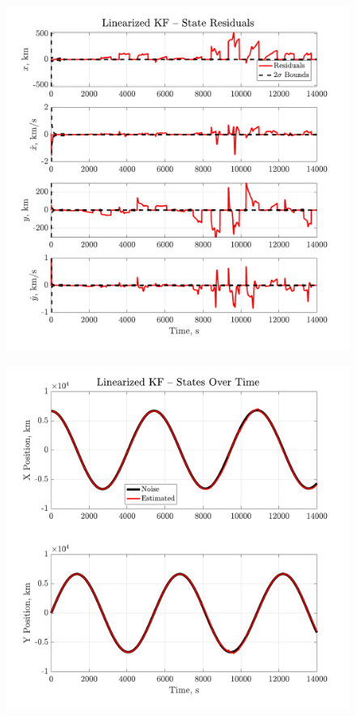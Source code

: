 \documentclass[a4paper]{aiaa-tc}
\begin{document}
  \begin{figure}[H]
 \centering
 \includegraphics[width=\textwidth]{Figures/LKF_residuals.pdf}
 \end{figure}
 
  \begin{figure}[H]
 \centering
 \includegraphics[width=\textwidth]{Figures/LKF_states.pdf}
 \end{figure}
 
\end{document}
